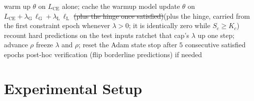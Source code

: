 \documentclass[10pt]{article}
\newcommand{\del}[1]{{\color{red}\sout{#1}}}
\begin{document}
\begin{algorithm}[t]
\caption{The training loop of the package studied here.}
\label{alg:tralo}
\begin{algorithmic}[1]
\State warm up $\theta$ on $L_{\text{CE}}$ alone; cache the warmup model
  \State update $\theta$ on $L_{\text{CE}} + \lambda_{\mathrm{G}}\,\ell_{\mathrm{G}} + \lambda_{\mathrm{L}}\,\ell_{\mathrm{L}}$ \del{(plus the hinge once satisfied)}{\color{blue}(plus the hinge, carried from the first constraint epoch whenever $\lambda>0$; it is identically zero while $S_c\ge K_c$)}
  \State recount hard predictions on the test inputs
    \State ratchet that cap's $\lambda$ up one step; advance $\rho$
    \State freeze $\lambda$ and $\rho$; reset the Adam state
  \EndIf
  \State stop after $5$ consecutive satisfied epochs
\EndFor
\State post-hoc verification (flip borderline predictions) if needed
\end{algorithmic}
\end{algorithm}

\section{Experimental Setup}
\label{sec:setup}
\end{document}
